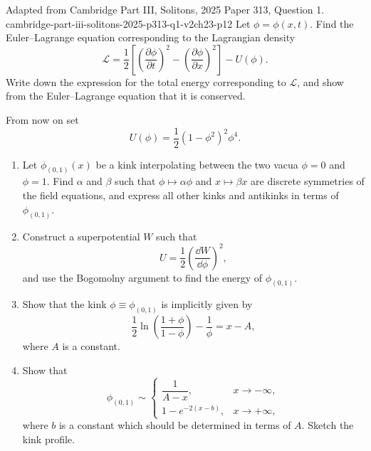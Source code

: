 \begin{enumerate}
  {Adapted from Cambridge Part III, Solitons, 2025 Paper 313,
  Question 1.}
  {cambridge-part-iii-solitons-2025-p313-q1-v2ch23-p12}
  Let \(\phi=\phi(x,t)\).  Find the Euler--Lagrange equation
  corresponding to the Lagrangian density
  \[
    \mathcal L=\frac12\left[
      \left(\frac{\partial\phi}{\partial t}\right)^2
      -\left(\frac{\partial\phi}{\partial x}\right)^2\right]
      -U(\phi).
  \]
  Write down the expression for the total energy corresponding to
  \(\mathcal L\), and show from the Euler--Lagrange equation that it is
  conserved.

  From now on set
  \[
    U(\phi)=\frac12(1-\phi^2)^2\phi^4.
  \]
  \begin{enumerate}
    \item[(i)] Let \(\phi_{(0,1)}(x)\) be a kink interpolating between the
      two vacua \(\phi=0\) and \(\phi=1\).  Find \(\alpha\) and \(\beta\)
      such that \(\phi\mapsto\alpha\phi\) and \(x\mapsto\beta x\) are
      discrete symmetries of the field equations, and express all other
      kinks and antikinks in terms of \(\phi_{(0,1)}\).
    \item[(ii)] Construct a superpotential \(W\) such that
      \[
        U=\frac12\left(\frac{\dd W}{\dd\phi}\right)^2,
      \]
      and use the Bogomolny argument to find the energy of
      \(\phi_{(0,1)}\).
    \item[(iii)] Show that the kink \(\phi\equiv\phi_{(0,1)}\) is
      implicitly given by
      \[
        \frac12\ln\left(\frac{1+\phi}{1-\phi}\right)
          -\frac1\phi=x-A,
      \]
      where \(A\) is a constant.
    \item[(iv)] Show that
      \[
        \phi_{(0,1)}\sim
        \begin{cases}
          \dfrac1{A-x},&x\to-\infty,\\[6pt]
          1-e^{-2(x-b)},&x\to+\infty,
        \end{cases}
      \]
      where \(b\) is a constant which should be determined in terms of
      \(A\).  Sketch the kink profile.
  \end{enumerate}


\end{enumerate}
